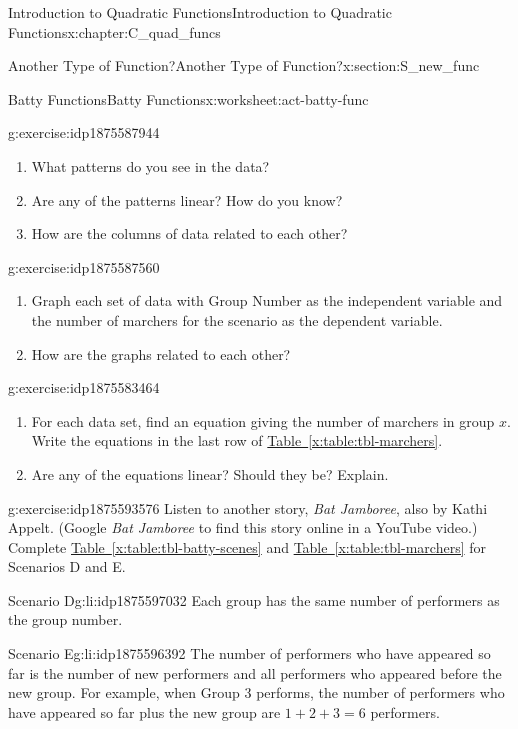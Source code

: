 \documentclass[oneside,10pt,]{book}
\newcommand{\xreffont}{\relax}
\newcommand{\pubtitle}[1]{\textsl{#1}}
\numberwithin{equation}{chapter}
\begin{document}
\begin{chapterptx}{Introduction to Quadratic Functions}{}{Introduction to Quadratic Functions}{}{}{x:chapter:C_quad_funcs}
\begin{sectionptx}{Another Type of Function?}{}{Another Type of Function?}{}{}{x:section:S_new_func}
\begin{worksheet-subsection}{Batty Functions}{}{Batty Functions}{}{}{x:worksheet:act-batty-func}
\begin{divisionexercise}{2}{}{}{g:exercise:idp1875587944}
\begin{enumerate}[font=\bfseries,label=(\alph*),ref=\alph*]
\item{}What patterns do you see in the data?%
\item{}Are any of the patterns linear? How do you know?%
\item{}How are the columns of data related to each other?%
\end{enumerate}
\end{divisionexercise}%
\begin{divisionexercise}{3}{}{}{g:exercise:idp1875587560}%
\begin{enumerate}[font=\bfseries,label=(\alph*),ref=\alph*]
\item\label{x:task:exer-marchers-graph}Graph each set of data with Group Number as the independent variable and the number of marchers for the scenario as the dependent variable.%
\item{}How are the graphs related to each other?%
\end{enumerate}
\end{divisionexercise}%
\begin{divisionexercise}{4}{}{}{g:exercise:idp1875583464}%
\begin{enumerate}[font=\bfseries,label=(\alph*),ref=\alph*]
\item{}For each data set, find an equation giving the number of marchers in group \(x\). Write the equations in the last row of \hyperref[x:table:tbl-marchers]{Table~{\xreffont\ref{x:table:tbl-marchers}}}.%
\item{}Are any of the equations linear? Should they be? Explain.%
\end{enumerate}
\end{divisionexercise}%
\clearpage
\begin{divisionexercise}{5}{}{}{g:exercise:idp1875593576}%
Listen to another story, \pubtitle{Bat Jamboree}, also by Kathi Appelt. (Google \pubtitle{Bat Jamboree} to find this story online in a YouTube video.) Complete \hyperref[x:table:tbl-batty-scenes]{Table~{\xreffont\ref{x:table:tbl-batty-scenes}}} and \hyperref[x:table:tbl-marchers]{Table~{\xreffont\ref{x:table:tbl-marchers}}} for Scenarios D and E.%
\begin{descriptionlist}
\begin{dlimedium}{Scenario D}{g:li:idp1875597032}%
Each group has the same number of performers as the group number.%
\end{dlimedium}%
\begin{dlimedium}{Scenario E}{g:li:idp1875596392}%
The number of performers who have appeared so far is the number of new performers and all performers who appeared before the new group. For example, when Group 3 performs, the number of performers who have appeared so far plus the new group are \(1 + 2 + 3 = 6\) performers.%

\end{dlimedium}
\end{descriptionlist}
\end{divisionexercise}
\end{worksheet-subsection}
\end{sectionptx}
\end{chapterptx}
\end{document}
